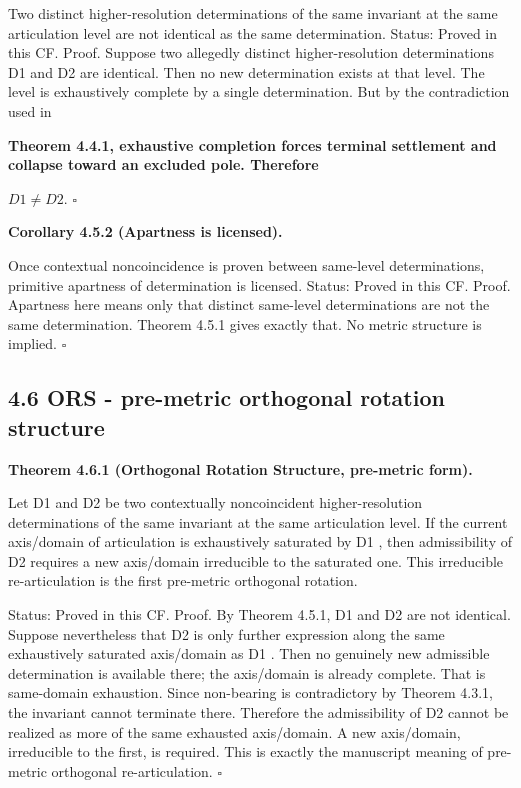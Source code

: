 \documentclass[11pt]{article}
\begin{document}
Two distinct higher-resolution determinations of the same invariant at the same articulation level are not identical as the same determination. Status: Proved in this CF. Proof. Suppose two allegedly distinct higher-resolution determinations D1 and D2 are identical. Then no new determination exists at that level. The level is exhaustively complete by a single determination. But by the contradiction used in

\textbf{Theorem 4.4.1, exhaustive completion forces terminal settlement and collapse toward an excluded pole. Therefore}

$D1 \neq D2$. $\square$

\textbf{Corollary 4.5.2 (Apartness is licensed).}

Once contextual noncoincidence is proven between same-level determinations, primitive apartness of determination is licensed. Status: Proved in this CF. Proof. Apartness here means only that distinct same-level determinations are not the same determination. Theorem 4.5.1 gives exactly that. No metric structure is implied. $\square$

\subsection{4.6 ORS - pre-metric orthogonal rotation structure}\label{ors---pre-metric-orthogonal-rotation-structure}

\textbf{Theorem 4.6.1 (Orthogonal Rotation Structure, pre-metric form).}

Let D1 and D2 be two contextually noncoincident higher-resolution determinations of the same invariant at the same articulation level. If the current axis/domain of articulation is exhaustively saturated by D1 , then admissibility of D2 requires a new axis/domain irreducible to the saturated one. This irreducible re-articulation is the first pre-metric orthogonal rotation.

Status: Proved in this CF. Proof. By Theorem 4.5.1, D1 and D2 are not identical. Suppose nevertheless that D2 is only further expression along the same exhaustively saturated axis/domain as D1 . Then no genuinely new admissible determination is available there; the axis/domain is already complete. That is same-domain exhaustion. Since non-bearing is contradictory by Theorem 4.3.1, the invariant cannot terminate there. Therefore the admissibility of D2 cannot be realized as more of the same exhausted axis/domain. A new axis/domain, irreducible to the first, is required. This is exactly the manuscript meaning of pre-metric orthogonal re-articulation. $\square$
\end{document}
